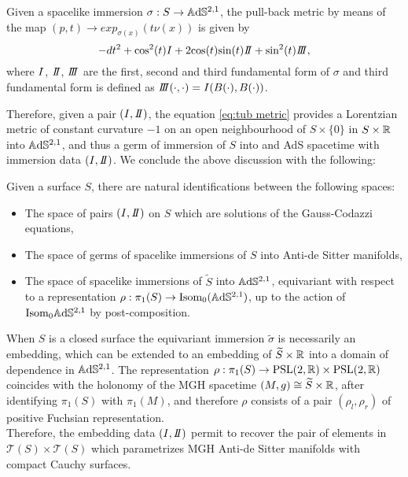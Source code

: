 \begin{corollary}\label{lem:tub metric}
    Given a spacelike immersion $\sigma:S\to \mathbb{A}\mathrm{d}\mathbb{S}^{2,1}$, the pull-back metric by means of the map $(p,t) \to exp_{\sigma(x)}(t\nu(x))$ is given by
    \begin{equation}\label{eq:tub metric}
        -dt^2 + \text{cos}^2(t)\I + 2\text{cos}(t)\text{sin}(t)\II + \text{sin}^2(t)\III,
    \end{equation}
    where $I$, $\II$, $\III$ are the first, second and third fundamental form of $\sigma$ and third fundamental form is defined as $\III(\cdot,\cdot)=\I(B(\cdot),B(\cdot))$.
\end{corollary}
Therefore, given a pair $(\I,\II)$, the equation \ref{eq:tub metric} provides a Lorentzian metric of constant curvature $-1$ on an open neighbourhood of $S \times\{0\}$ in $S\times\mathbb{R}$ into $\mathbb{A}\mathrm{d}\mathbb{S}^{2,1}$, and thus a germ of immersion of $S$ into and AdS spacetime with immersion data $(\I,\II)$. We conclude the above discussion with the following:
\begin{proposition}\label{thm:immersion data classification}
    Given a surface $S$, there are natural identifications between the following spaces:
    \begin{itemize}
        \item The space of pairs $(\I,\II)$ on $S$ which are solutions of the Gauss-Codazzi equations,
        \item The space of germs of spacelike immersions of $S$ into Anti-de Sitter manifolds,
        \item The space of spacelike immersions of $\widetilde{S}$ into $\mathbb{A}\mathrm{d}\mathbb{S}^{2,1}$, equivariant with respect to a representation $\rho:\pi_1(S) \to \text{Isom}_0(\mathbb{A}\mathrm{d}\mathbb{S}^{2,1})$, up to the action of $\text{Isom}_0\mathbb{A}\mathrm{d}\mathbb{S}^{2,1}$ by post-composition.
    \end{itemize}
\end{proposition}
When $S$ is a closed surface the equivariant immersion $\widetilde{\sigma}$ is necessarily an embedding, which can be extended to an embedding of $\widetilde{S}\times\mathbb{R}$ into a domain of dependence in $\mathbb{A}\mathrm{d}\mathbb{S}^{2,1}$. The representation $\rho:\pi_1(S) \to \text{PSL}(2,\mathbb{R}) \times \text{PSL}(2,\mathbb{R})$ coincides with the holonomy of the MGH spacetime $(M,g) \cong \widetilde{S}\times\mathbb{R}$, after identifying $\pi_1(S)$ with $\pi_1(M)$, and therefore $\rho$ consists of a pair $(\rho_l,\rho_r)$ of positive Fuchsian representation.\\
Therefore, the embedding data $(\I,\II)$ permit to recover the pair of elements in $\mathcal{T}(S)\times\mathcal{T}(S)$ which parametrizes MGH Anti-de Sitter manifolds with compact Cauchy surfaces.

